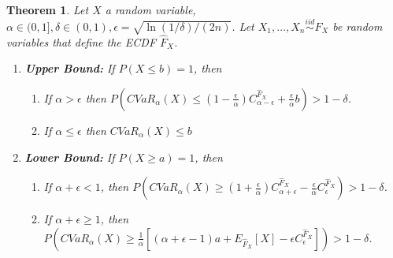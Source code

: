 \documentclass[letterpaper]{article} %
\newtheorem{theorem}{Theorem}[section]
\newcommand{\KP}[1]{\textcolor{red}{#1}}
\begin{document}
%		
%		
%		
\begin{theorem}
	\label{thm:ecdf_cvar_bound}
	Let $X$ a random variable, $\alpha\in (0, 1],\delta \in (0, 1), \epsilon=\sqrt{\ln(1/\delta)/(2n)}$. Let $X_1, \dots, X_n \overset{iid}{\sim} F_X$ be random variables that define the ECDF $\hat{F}_X$. 
	\begin{enumerate}
		\item \textbf{Upper Bound:} If $P(X\leq b)=1$, then 
			\begin{enumerate}
				\item If $\alpha > \epsilon$ then $P(CVaR_\alpha(X) \leq (1-\frac{\epsilon}{\alpha})C_{\alpha-\epsilon}^{\hat{F}_X} + \frac{\epsilon}{\alpha}b)> 1-\delta$.
				
				\item If $\alpha\leq \epsilon$ then $CVaR_\alpha(X)\leq b$
			\end{enumerate}
			
		\item \textbf{Lower Bound:} If $P(X\geq a)=1$, then 
			\begin{enumerate}
				\item If $\alpha+\epsilon < 1$, then $P(CVaR_\alpha(X)\geq (1+\frac{\epsilon}{\alpha})C_{\alpha+\epsilon}^{\hat{F}_X}-\frac{\epsilon}{\alpha}C_{\epsilon}^{\hat{F}_X})> 1-\delta$.
				
				\item If $\alpha+\epsilon \geq 1$, then $P(CVaR_\alpha(X) \geq \frac{1}{\alpha}[(\alpha+\epsilon - 1)a + E_{\hat{F}_X}[X] - \epsilon C_\epsilon^{\hat{F}_X}]) > 1-\delta$.
			\end{enumerate}
	\end{enumerate}
\end{theorem}
\end{document}
